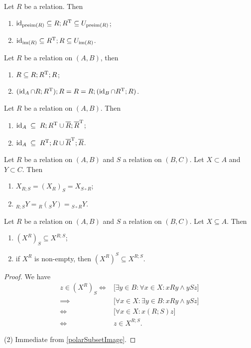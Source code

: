 \begin{lemma} \label{kernelInclusions}
Let $R$ be a relation. Then
\begin{enumerate}
\item $\operatorname{id}_{\operatorname{preim}(R)} \subseteq R;R^{\mathrm{T}} \subseteq U_{\operatorname{preim}(R)}$;
\item $\operatorname{id}_{\operatorname{im}(R)} \subseteq R^{\mathrm{T}};R \subseteq U_{\operatorname{im}(R)}$.
\end{enumerate}
\end{lemma}
\begin{corollary}
Let $R$ be a relation on $(A,B)$, then
\begin{enumerate}
\item $R \subseteq R;R^{\mathrm{T}};R$;
\item $(\operatorname{id}_A \cap R;R^{\mathrm{T}});R = R = R;(\operatorname{id}_{B}\cap R^{\mathrm{T}};R)$.
\end{enumerate}
\end{corollary}
\begin{corollary}
Let $R$ be a relation on $(A,B)$. Then
\begin{enumerate}
\item $\operatorname{id}_A \;\subseteq\; R;R^{\mathrm{T}} \cup \overline{R};\overline{R}^{\mathrm{T}}$;
\item $\operatorname{id}_A \;\subseteq\; R^{\mathrm{T}};R \cup \overline{R}^{\mathrm{T}};\overline{R}$.
\end{enumerate}
\end{corollary}

\begin{lemma}
Let $R$ be a relation on $(A, B)$ and $S$ a relation on $(B, C)$. Let $X\subset A$ and $Y\subset C$. Then
\begin{enumerate}
\item $X_{R;S} = (X_R)_S = X_{S\circ R}$;
\item $_{R;S}Y = {_R({_SY})} = {_{S\circ R}Y}$.
\end{enumerate}
\end{lemma}

\begin{lemma} \label{compositionInPolar}
Let $R$ be a relation on $(A,B)$ and $S$ a relation on $(B,C)$. Let $X\subseteq A$. Then
\begin{enumerate}
\item $(X^R)_S \subseteq X^{R;S}$;
\item if $X^R$ is non-empty, then $(X^R)^S \subseteq X^{R;S}$.
\end{enumerate}
\end{lemma}
\begin{proof}
We have
\begin{align*}
z\in (X^R)_S \iff& \Big[\exists y\in B: \forall x\in X: xRy \land ySz\Big] \\
\implies& \Big[\forall x\in X:\exists y\in B: xRy \land ySz\Big] \\
\iff& \Big[\forall x\in X: x(R;S)z\Big] \\
\iff& z\in X^{R;S}.
\end{align*}

(2) Immediate from \ref{polarSubsetImage}.
\end{proof}

